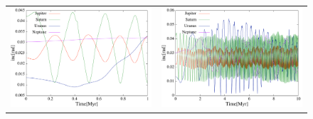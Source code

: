 \documentclass[11pt,a4paper,oneside,onecolumn]{jarticle}
\begin{document}
\begin{figure}[H]
\begin{tabular}{cc}
\begin{minipage}[t]{0.45\hsize}
\centering
\includegraphics[width=7.6cm]{./image/move500kyr_inc_1Myr.pdf}
\end{minipage} &
\begin{minipage}[t]{0.45\hsize}
\centering
\includegraphics[width=7.6cm]{./image/move500kyr_inc_10Myr.pdf}
\end{minipage}
%
\end{tabular}
\caption{\label{}}
\end{figure}
\end{document}
